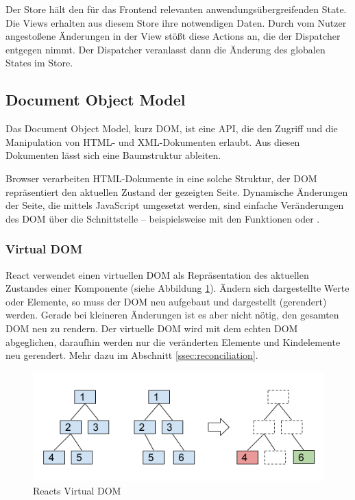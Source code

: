 Der Store hält den für das Frontend relevanten anwendungsübergreifenden State. Die Views erhalten aus diesem Store ihre notwendigen Daten. Durch vom Nutzer angestoßene Änderungen in der View stößt diese Actions an, die der Dispatcher entgegen nimmt. Der Dispatcher veranlasst dann die Änderung des globalen States im Store.\cite{Flux_Concepts}

\subsection{Document Object Model}
Das Document Object Model, kurz DOM, ist eine API, die den Zugriff und die Manipulation von HTML- und XML-Dokumenten erlaubt. Aus diesen Dokumenten lässt sich eine Baumstruktur ableiten.

Browser verarbeiten HTML-Dokumente in eine solche Struktur, der DOM repräsentiert den aktuellen Zustand der gezeigten Seite. Dynamische Änderungen der Seite, die mittels JavaScript umgesetzt werden, sind einfache Veränderungen des DOM über die Schnittstelle -- beispielsweise mit den Funktionen  oder .

\subsubsection{Virtual DOM}
React verwendet einen virtuellen DOM als Repräsentation des aktuellen Zustandes einer Komponente (siehe Abbildung \ref{fig:reactdom}). Ändern sich dargestellte Werte oder Elemente, so muss der DOM neu aufgebaut und dargestellt (gerendert) werden. Gerade bei kleineren Änderungen ist es aber nicht nötig, den gesamten DOM neu zu rendern. Der virtuelle DOM wird mit dem echten DOM abgeglichen, daraufhin werden nur die veränderten Elemente und Kindelemente neu gerendert\cite{VirtualDOM}. Mehr dazu im Abschnitt \ref{ssec:reconciliation}.

\begin{figure}
  \centering
  \includegraphics[scale=0.7]{Grafiken/reactvdom.png}
  \caption{Reacts Virtual DOM}
  \label{fig:reactdom}
\end{figure}

